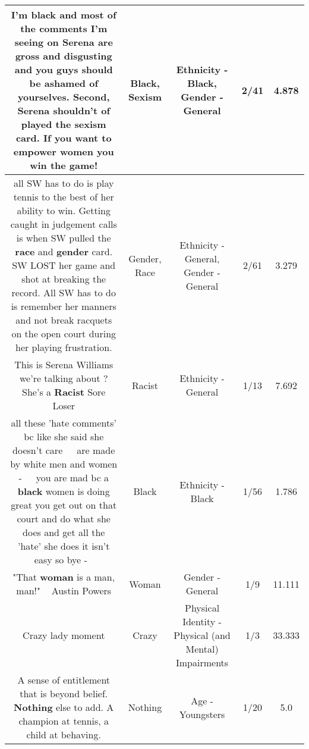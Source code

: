 \documentclass[11pt]{article}
\newlength\mylength
\begin{document}
\begin{center}
\begin{longtable}{|C{.65\mylength}|C{.30\mylength}|C{.12\mylength}|C{.12\mylength}|C{.12\mylength}|}
  \small I'm \textbf{black} and most of the comments I'm seeing on Serena are gross and disgusting and you guys should be ashamed of yourselves. Second, Serena shouldn't of played the \textbf{sexism} card. If you want to empower women you win the game!\normalsize   & Black, Sexism & Ethnicity - Black, Gender - General & 2/41 & 4.878 \\  \hline
  \small all SW has to do is play tennis to the best of her ability to win.  Getting caught in judgement calls is when SW pulled the \textbf{race} and \textbf{gender} card.  SW LOST her game and shot at breaking the record.  All SW has to do is remember her manners and not break racquets on the open court during her playing frustration.\normalsize   & Gender, Race & Ethnicity - General, Gender - General & 2/61 & 3.279 \\  \hline
  \small This is Serena Williams we're talking about ? She's a \textbf{Racist} Sore Loser\normalsize   & Racist & Ethnicity - General & 1/13 & 7.692 \\  \hline
  \small all these 'hate comments' bc like she said she doesn't care 🤣✌🏾 are made by white men and women - 🤣✋🏾 you are mad bc a \textbf{black} women is doing great you get out on that court and do what she does and get all the 'hate' she does it isn't easy so bye - 🤣\normalsize   & Black & Ethnicity - Black & 1/56 & 1.786 \\  \hline
  \small "That \textbf{woman} is a man, man!" ~ Austin Powers\normalsize   & Woman & Gender - General & 1/9 & 11.111 \\  \hline
  \small Crazy lady moment\normalsize   & Crazy & Physical Identity - Physical (and Mental) Impairments & 1/3 & 33.333 \\  \hline
  \small A sense of entitlement that is beyond belief. \textbf{Nothing} else to add. A champion at tennis, a child at behaving.\normalsize   & Nothing & Age - Youngsters & 1/20 & 5.0 \\  \hline

\end{longtable}
\end{center}
\end{document}
